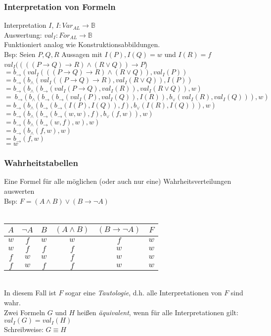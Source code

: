 \documentclass{beamer}
\begin{document}
	\begin{frame}
		\frametitle{Interpretation von Formeln}
		Interpretation $I$, $I: Var_{AL}\longrightarrow\mathbb{B}$\\
		Auswertung: $val_{I}: For_{AL}\longrightarrow\mathbb{B}$\\
		Funktioniert analog wie Konstruktionsabbildungen.\\
		Bsp: Seien $P, Q, R$ Aussagen mit $I(P), I(Q) = w$ und $I(R) = f$\\
		$val_{I}((((P\rightarrow Q)\rightarrow R)\wedge(R\vee Q))\rightarrow P$)\\ %
		$=b_{\rightarrow}(val_{I}(((P\rightarrow Q)\rightarrow R)\wedge(R\vee Q)), val_{I}(P))$\\
		$=b_{\rightarrow}(b_{\wedge}(val_{I}((P\rightarrow Q)\rightarrow R),val_{I}(R\vee Q)), I(P))$\\
		$=b_{\rightarrow}(b_{\wedge}(b_{\rightarrow}(val_{I}(P\rightarrow Q), val_{I}(R)), val_{I}(R\vee Q)), w)$\\
		$=~b_{\rightarrow}(b_{\wedge}(b_{\rightarrow}(b_{\rightarrow}(val_{I}(P), val_{I}(Q)), I(R)), b_{\vee}(val_{I}(R), val_{I}(Q))), w)$\\
		$=b_{\rightarrow}(b_{\wedge}(b_{\rightarrow}(b_{\rightarrow}(I(P), I(Q)), f), b_{\vee}(I(R), I(Q))), w)$\\
		$=b_{\rightarrow}(b_{\wedge}(b_{\rightarrow}(b_{\rightarrow}(w, w), f), b_{\vee}(f, w)), w)$\\
		$=b_{\rightarrow}(b_{\wedge}(b_{\rightarrow}(w, f), w), w)$\\
		$=b_{\rightarrow}(b_{\wedge}(f, w), w)$\\
		$=b_{\rightarrow}(f, w)$\\
		$=w$\\
	\end{frame}
	\begin{frame}
		\frametitle{Wahrheitstabellen}
		Eine Formel für alle möglichen (oder auch nur eine) Wahrheitsverteilungen auswerten\\
		Bsp: $F = (A\wedge B)\vee(B\rightarrow\neg A)$\\
		\textcolor{white}{.}\\ %
		\begin{tabular}{ccc|cc|c}
			$A$ & $\neg A$ & $B$ & $(A\wedge B)$ & $(B\rightarrow\neg A)$ & $F$ \\
			\hline
			$w$ & $f$ & $w$ & $w$ & $f$ & $w$\\
			$w$ & $f$ & $f$ & $f$ & $w$ & $w$\\
			$f$ & $w$ & $w$ & $f$ & $w$ & $w$\\
			$f$ & $w$ & $f$ & $f$ & $w$ & $w$\\
		\end{tabular}\\
		In diesem Fall ist $F$ sogar eine \emph{Tautologie}, d.h. alle Interpretationen von $F$ sind wahr.\\
		Zwei Formeln $G$ und $H$ heißen \emph{äquivalent}, wenn für alle Interpretationen gilt: $val_{I}(G) = val_{I}(H)$\\
		Schreibweise: $G\equiv H$\\
	\end{frame}
\end{document}
